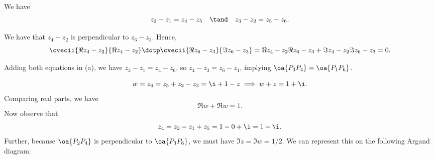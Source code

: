 \begin{solution}
    \begin{ppart}
        We have \[z_2 - z_1 = z_4 - z_5 \quad \tand \quad z_3 - z_2 = z_5 - z_6.\]
    \end{ppart}
    \begin{ppart}
        We have that $z_4 - z_2$ is perpendicular to $z_6 - z_3$. Hence, \[\cvecii{\Re{z_4 - z_2}}{\Re{z_4 - z_2}} \dotp \cvecii{\Re{z_6 - z_3}}{\Im{z_6 - z_3}} = \Re{z_4 - z_2}\Re{z_6 - z_3} + \Im{z_4 - z_2}\Im{z_6 - z_3} = 0.\]
    \end{ppart}
    \begin{ppart}
        Adding both equations in (a), we have $z_3 - z_1 = z_4 - z_6$, so $z_4 - z_3 = z_6 - z_1$, implying $\oa{P_3 P_4} = \oa{P_1 P_6}$.
    \end{ppart}
    \begin{ppart}
        \[w = z_6 = z_5 + z_2 - z_3 = \i + 1 - z \implies w+z = 1 + \i.\] Comparing real parts, we have \[\Re{w} + \Re{w} = 1.\] Now observe that \[z_4 = z_2 - z_1 + z_5 = 1 - 0 + \i = 1 + \i.\] Further, because $\oa{P_2 P_4}$ is perpendicular to $\oa{P_3 P_6}$, we must have $\Im{z} = \Im{w} = 1/2$. We can represent this on the following Argand diagram:

        \begin{center}
\end{center}
\end{ppart}
\end{solution}

